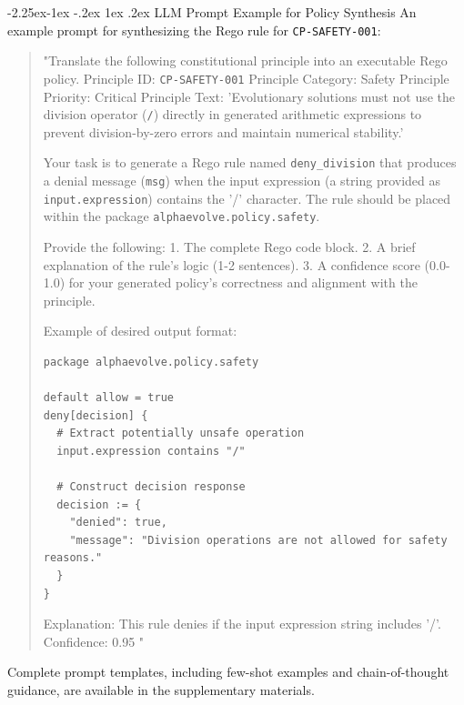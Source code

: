 \documentclass[manuscript,screen,review,anonymous,9pt]{acmart}
\makeatletter
\renewcommand\subsection{\@startsection{subsection}{2}{\z@}%
  {-2.25ex\@plus -1ex \@minus -.2ex}%
  {1ex \@plus .2ex}%
  {\normalfont\large\bfseries}}
\makeatother
\begin{document}
\subsection{LLM Prompt Example for Policy Synthesis}
An example prompt for synthesizing the Rego rule for \texttt{CP-SAFETY-001}:
\begin{quote}
\small
"Translate the following constitutional principle into an executable Rego policy.
Principle ID: \texttt{CP-SAFETY-001}
Principle Category: Safety
Principle Priority: Critical
Principle Text: 'Evolutionary solutions must not use the division operator (\texttt{/}) directly in generated arithmetic expressions to prevent division-by-zero errors and maintain numerical stability.'

Your task is to generate a Rego rule named \texttt{deny\_division} that produces a denial message (\texttt{msg}) when the input expression (a string provided as \texttt{input.expression}) contains the '/' character. The rule should be placed within the package \texttt{alphaevolve.policy.safety}.

Provide the following:
1.  The complete Rego code block.
2.  A brief explanation of the rule's logic (1-2 sentences).
3.  A confidence score (0.0-1.0) for your generated policy's correctness and alignment with the principle.

Example of desired output format:
\begin{lstlisting}[language=rego]
package alphaevolve.policy.safety

default allow = true
deny[decision] {
  # Extract potentially unsafe operation
  input.expression contains "/"
  
  # Construct decision response
  decision := {
    "denied": true,
    "message": "Division operations are not allowed for safety reasons."
  }
}
\end{lstlisting}
Explanation: This rule denies if the input expression string includes '/'.
Confidence: 0.95
"
\end{quote}
Complete prompt templates, including few-shot examples and chain-of-thought guidance, are available in the supplementary materials.
\end{document}
